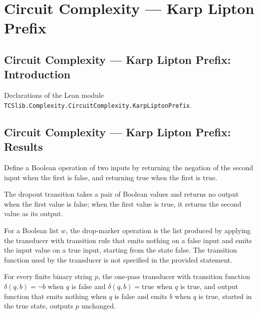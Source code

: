 \section{Circuit Complexity --- Karp Lipton Prefix}
\subsection*{Circuit Complexity --- Karp Lipton Prefix: Introduction}

Declarations of the Lean module \texttt{TCSlib.Complexity.CircuitComplexity.KarpLiptonPrefix}.

\subsection*{Circuit Complexity --- Karp Lipton Prefix: Results}

\begin{definition}
\label{Complexity.KarpLipton.dropTr}
\leanok
Define a Boolean operation of two inputs by returning the negation of the second input
when the first is false, and returning true when the first is true.
\end{definition}

\begin{definition}
\label{Complexity.KarpLipton.dropOut}
\leanok
The dropout transition takes a pair of Boolean values and returns no output when the
first value is false; when the first value is true, it returns the second value as its
output.
\end{definition}

\begin{definition}
\label{Complexity.KarpLipton.dropMarker}
\leanok
{}
For a Boolean list $w$, the drop-marker operation is the list produced by applying the
transducer with transition rule that emits nothing on a false input and emits the input
value on a true input, starting from the state false. The transition function used by
the transducer is not specified in the provided statement.
\end{definition}

\begin{theorem}
\label{Complexity.KarpLipton.transduce_drop_true}
\leanok
{}
For every finite binary string $p$, the one-pass transducer with transition function
$\delta(q,b)=\neg b$ when $q$ is false and $\delta(q,b)=\mathrm{true}$ when $q$ is true,
and output function that emits nothing when $q$ is false and emits $b$ when $q$ is true,
started in the true state, outputs $p$ unchanged.
\end{theorem}

